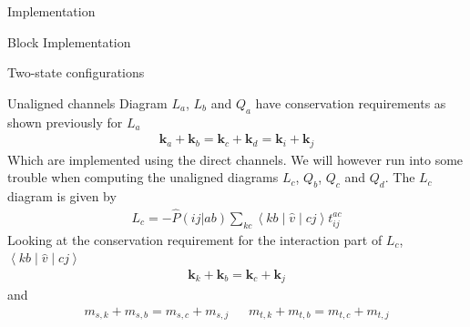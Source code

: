 \documentclass[twoside,english]{uiofysmaster}
\begin{document}
\begin{chapter}{Implementation}
\begin{section}{Block Implementation}
\begin{subsection}{Two-state configurations}
		\end{subsection}
		
		\begin{subsection}{Unaligned channels}
			Diagram $L_a$, $L_b$ and $Q_a$ have conservation requirements as shown previously for $L_a$
			\begin{align}
			 	\mathbf{k}_a + \mathbf{k}_b = \mathbf{k}_c + \mathbf{k}_d = \mathbf{k}_i + \mathbf{k}_j 
			\end{align}
			Which are implemented using the direct channels. We will however run into some trouble when computing the unaligned diagrams $L_c$, $Q_b$, $Q_c$ and $Q_d$. The $L_c$ diagram is given by 
			\begin{align}
				L_c = - \hat P(ij|ab) \sum_{kc} \left<kb\middle|\hat v\middle| cj \right> t_{ij}^{ac}
			\end{align}
			Looking at the conservation requirement for the interaction part of $L_c$, $\left<kb\middle|\hat v\middle| cj \right>$
			\begin{align}
				\mathbf{k}_k + \mathbf{k}_b = \mathbf{k}_c + \mathbf{k}_j
			\end{align}
			and 
			\begin{align}
				m_{s,k} + m_{s,b} = m_{s,c} + m_{s,j}  \:\:\:\:\:\:\: m_{t,k} + m_{t,b} = m_{t,c} + m_{t,j} 
			\end{align}

		\end{subsection}

	\end{section}
\end{chapter}
\end{document}

